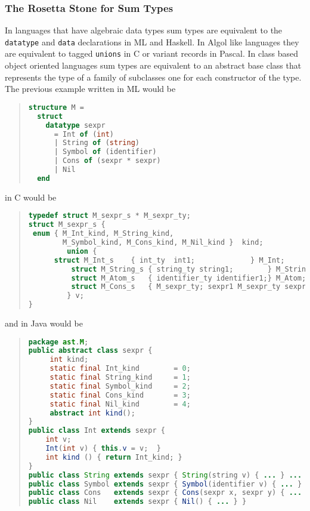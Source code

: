 \subsubsection{The Rosetta Stone for Sum Types}
\label{sec:rosetta-stone}

In languages that have algebraic data types sum types are equivalent to the
\lstinline[language=ASDL]!datatype! and \lstinline[language=ASDL]!data! declarations in ML and Haskell. In Algol like
languages they are equivalent to tagged \lstinline[language=ASDL]!unions! in C or variant records
in Pascal. In class based object oriented languages sum types are equivalent
to an abstract base class that represents the type of a family of subclasses
one for each constructor of the type. The previous example written in ML would
be
\begin{quote}\begin{lstlisting}[language=SML]
structure M =
  struct
    datatype sexpr
      = Int of (int)
      | String of (string)
      | Symbol of (identifier)
      | Cons of (sexpr * sexpr)
      | Nil
  end
\end{lstlisting}\end{quote}%
in C would be
\begin{quote}\begin{lstlisting}[language=c]
typedef struct M_sexpr_s * M_sexpr_ty;
struct M_sexpr_s { 
 enum { M_Int_kind, M_String_kind, 
        M_Symbol_kind, M_Cons_kind, M_Nil_kind }  kind;
         union {
	  struct M_Int_s    { int_ty  int1;             } M_Int;
          struct M_String_s { string_ty string1;        } M_String;	 
          struct M_Atom_s   { identifier_ty identifier1;} M_Atom;
          struct M_Cons_s   { M_sexpr_ty; sexpr1 M_sexpr_ty sexpr2 }; M_Cons;
         } v;
}
\end{lstlisting}\end{quote}%
and in Java would be
\begin{quote}\begin{lstlisting}[language=java]
package ast.M;
public abstract class sexpr {
	 int kind;
	 static final Int_kind        = 0;
	 static final String_kind     = 1;
	 static final Symbol_kind     = 2;
	 static final Cons_kind       = 3;
	 static final Nil_kind        = 4;
	 abstract int kind();
}
public class Int extends sexpr { 
    int v; 
    Int(int v) { this.v = v;  } 
    int kind () { return Int_kind; }
}
public class String extends sexpr { String(string v) { ... } ... }
public class Symbol extends sexpr { Symbol(identifier v) { ... } ... }
public class Cons   extends sexpr { Cons(sexpr x, sexpr y) { ... } }
public class Nil    extends sexpr { Nil() { ... } }
\end{lstlisting}\end{quote}%

